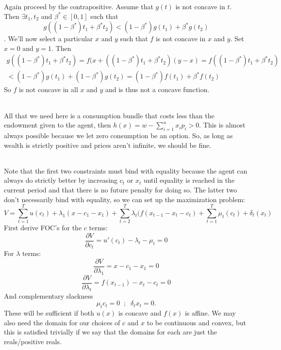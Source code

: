 \documentclass[12pt,leqno]{article}
\newcommand{\sumni}{\sum^n_{i=1}}
\begin{document}
 Again proceed by the contrapositive. Assume that $g(t)$ is not concave in $t$. Then $\exists t_1, t_2$ and $\beta^* \in [0,1]$ such that
$$g((1-\beta^*)t_1 + \beta^* t_2)<(1-\beta^*)g(t_1) + \beta^*g(t_2)$$.
We'll now select a particular $x$ and $y$ such that $f$ is not concave in $x$ and $y$. Set $x = 0$ and $y = 1$. Then 
\begin{multline*}
g((1-\beta^*)t_1 + \beta^* t_2) = f(x + ((1-\beta^*)t_1 + \beta^* t_2)(y-x) = f((1-\beta^*)t_1 + \beta^* t_2)\\
<(1-\beta^*)g(t_1) + (1-\beta^*)g(t_2) = (1-\beta^*)f(t_1) + \beta^*f(t_2)
\end{multline*}
So $f$ is not concave in all $x$ and $y$ and is thus not a concave function.


\bigskip
{}\\
\indent All that we need here is a consumption bundle that costs less than the endowment given to the agent, then $h(x) = w - \sumni x_i p_i >0$. This is almost always possible because we let zero consumption be an option. So, as long as wealth is strictly positive and prices aren't infinite, we should be fine.

\bigskip
{}\\
\indent Note that the first two constraints must bind with equality because the agent can always do strictly better by increasing $c_t$ or $x_t$ until equality is reached in the current period and that there is no future penalty for doing so. The latter two don't necessarily bind with equality, so we can set up the maximization problem:
$$V=\sum^T_{t=1} u(c_t) + \lambda_1(x - c_1 - x_1) + \sum^T_{t=2}\lambda_t(f(x_{t-1}-x_t-c_t) + \sum^T_{t=1} \mu_t(c_t) + \delta_t(x_t)$$
First derive FOC's for the $c$ terms:
$$\frac{\partial V}{\partial c_t} = u'(c_t) - \lambda_t - \mu_t = 0$$
For $\lambda$ terms:
$$\frac{\partial V}{\partial \lambda_1} = x - c_1 - x_1 = 0$$
$$\frac{\partial V}{\partial \lambda_t} = f(x_{t-1}) - x_t - c_t = 0$$
And complementary slackness
$$\mu_t c_t = 0 \;\; ; \;\; \delta_t x_t = 0.$$
These will be sufficient if both $u(x)$ is concave and $f(x)$ is affine. We may also need the domain for our choices of $c$ and $x$ to be continuous and convex, but this is satisfied trivially if we say that the domains for each are just the reals/positive reals.
\end{document}
